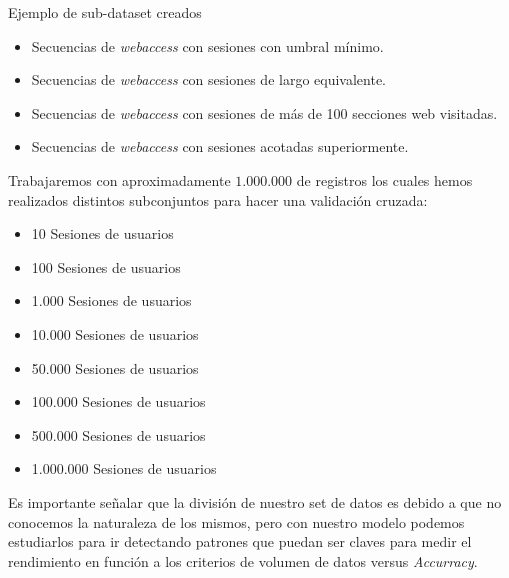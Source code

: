 Ejemplo de sub-dataset creados
\begin{itemize}
	\menorEspacioItemize
	\item Secuencias de \emph{webaccess} con sesiones con umbral mínimo.
	\item Secuencias de \emph{webaccess} con sesiones de largo equivalente.
	\item Secuencias de \emph{webaccess} con sesiones de más de 100 secciones web visitadas.
	\item Secuencias de \emph{webaccess} con sesiones acotadas superiormente.
\end{itemize}


Trabajaremos con aproximadamente $1.000.000$ de registros los cuales hemos realizados distintos subconjuntos para hacer una validación cruzada:

\begin{itemize}
	\menorEspacioItemize
	\item 10 Sesiones de usuarios
	\item 100 Sesiones de usuarios
	\item 1.000 Sesiones de usuarios
	\item 10.000 Sesiones de usuarios
	\item 50.000 Sesiones de usuarios
	\item 100.000 Sesiones de usuarios
	\item 500.000 Sesiones de usuarios
	\item 1.000.000 Sesiones de usuarios
\end{itemize}


Es importante señalar que la división de nuestro set de datos es debido a que no conocemos la naturaleza de los mismos, pero con nuestro modelo podemos estudiarlos para ir detectando patrones que puedan ser claves para medir el rendimiento en función a los criterios de volumen de datos versus \emph{Accurracy}.






